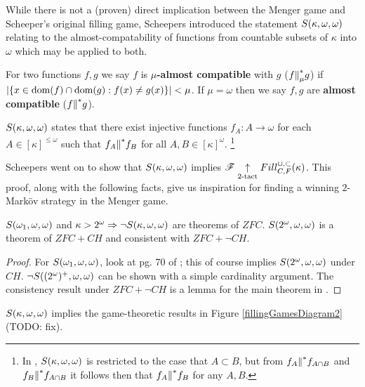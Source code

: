 While there is not a (proven) direct implication between the Menger game and
Scheeper's original filling game, Scheepers introduced the statement
$S(\kappa,\omega,\omega)$ relating to the almost-compatability of functions
from countable subsets of $\kappa$ into $\omega$ which may be applied to
both.

\begin{defn}
  For two functions $f,g$ we say $f$ is \textbf{$\mu$-almost compatible} with
  $g$ ($f{\parallel}^*_\mu g$) if $|\{x\in\textrm{dom}(f)\cap\textrm{dom}(g):f(x)\not=g(x)\}|<\mu$.
  If $\mu=\omega$ then we say $f,g$ are \textbf{almost compatible}
  ($f{\parallel}^* g$).
\end{defn}

\begin{defn}
  $S(\kappa,\omega,\omega)$ states that there exist injective functions
  $f_A:A\to\omega$ for each $A\in[\kappa]^{\leq\omega}$ such that
  $f_A{\parallel}^* f_B$ for all $A,B\in[\kappa]^\omega$.
  \footnote{
    In \cite{MR1129143}, $S(\kappa,\omega,\omega)$ is restricted to the case that
    $A\subset B$, but from $f_A{\parallel}^* f_{A\cap B}$ and
    $f_B{\parallel}^* f_{A\cap B}$ it follows then that $f_A{\parallel}^* f_B$ for any
    $A,B$.
  }
\end{defn}

Scheepers went on to show that $S(\kappa,\omega,\omega)$ implies
$\mathscr{F} \underset{2\text{-tact}}{\uparrow} Fill^{\cup,\subset}_{C,F}(\kappa)$. This proof, along with the following
facts, give us inspiration for
finding a winning $2$-Mark\"ov strategy in the Menger game.

\begin{thm}
  $S(\omega_1,\omega,\omega)$ and $\kappa>2^\omega\Rightarrow\neg S(\kappa,\omega,\omega)$
  are theorems of $ZFC$.
  $S(2^\omega,\omega,\omega)$ is a theorem of $ZFC+CH$ and consistent with
  $ZFC+\neg CH$.
\end{thm}

\begin{proof}
  For $S(\omega_1,\omega,\omega)$, look at pg. 70 of \cite{MR597342}; this of course
  implies $S(2^\omega,\omega,\omega)$ under $CH$.
  $\neg S((2^\omega)^+,\omega,\omega)$ can be shown with a simple cardinality argument.
  The consistency result under $ZFC+\neg CH$
  is a lemma for the main theorem in \cite{MR1129143}.
\end{proof}

\begin{thm}
  $S(\kappa,\omega,\omega)$ implies the game-theoretic results in
  Figure \ref{fillingGamesDiagram2} (TODO: fix).
\end{thm}

